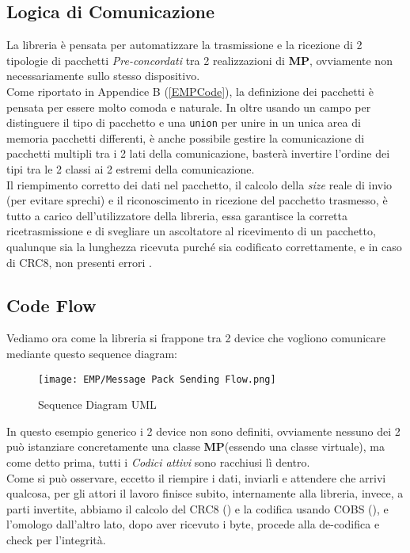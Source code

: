 \subsection{Logica di Comunicazione}
\vspace{-5mm}
La libreria è pensata per automatizzare la trasmissione e la ricezione di 2 tipologie di pacchetti \textit{Pre-concordati} tra 2 realizzazioni di \textbf{MP}, ovviamente non necessariamente sullo stesso dispositivo.\\
Come riportato in Appendice B (\ref{EMPCode}), la definizione dei pacchetti è pensata per essere molto comoda e naturale. In oltre usando un campo per distinguere il tipo di pacchetto e una \verb|union| per unire in un unica area di memoria pacchetti differenti, è anche possibile gestire la comunicazione di pacchetti multipli tra i 2 lati della comunicazione, basterà invertire l'ordine dei tipi tra le 2 classi ai 2 estremi della comunicazione.\\
Il riempimento corretto dei dati nel pacchetto, il calcolo della \textit{size} reale di invio (per evitare sprechi) e il riconoscimento in ricezione del pacchetto trasmesso, è tutto a carico dell'utilizzatore della libreria, essa garantisce la corretta ricetrasmissione e di svegliare un ascoltatore al ricevimento di un pacchetto, qualunque sia la lunghezza ricevuta purché sia codificato correttamente, e in caso di CRC8, non presenti errori .


\newpage
\subsection{Code Flow}\label{sub:codeFlow}
Vediamo ora come la libreria si frappone tra 2 device che vogliono comunicare mediante questo sequence diagram:
\begin{figure}[H]
	\centering
	\caption[Sequence Diagram UML di EMP]{Sequence Diagram UML}
	\texttt{[image: EMP/Message Pack Sending Flow.png]}
\end{figure}
\noindent
In questo esempio generico i 2 device non sono definiti, ovviamente nessuno dei 2 può istanziare concretamente una classe \textbf{MP}(essendo una classe virtuale), ma come detto prima, tutti i \textit{Codici attivi} sono racchiusi lì dentro.\\
Come si può osservare, eccetto il riempire i dati, inviarli e attendere che arrivi qualcosa, per gli attori il lavoro finisce subito, internamente alla libreria, invece, a parti invertite, abbiamo il calcolo del CRC8 (\cite{CRC8}) e la codifica usando COBS (\cite{COBS}), e l'omologo dall'altro lato, dopo aver ricevuto i byte, procede alla de-codifica e check per l'integrità.\\

